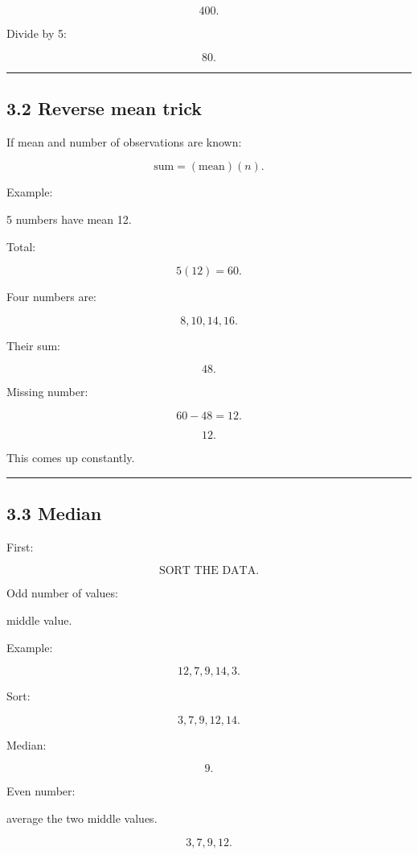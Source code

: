 \documentclass[
]{article}
\begin{document}
\[
400.
\]

Divide by 5:

\[
\boxed{80}.
\]

\begin{center}\rule{0.5\linewidth}{0.5pt}\end{center}

\subsection{3.2 Reverse mean trick}\label{reverse-mean-trick}

If mean and number of observations are known:

\[
\boxed{\text{sum}=(\text{mean})(n)}.
\]

Example:

5 numbers have mean 12.

Total:

\[
5(12)=60.
\]

Four numbers are:

\[
8,10,14,16.
\]

Their sum:

\[
48.
\]

Missing number:

\[
60-48=12.
\]

\[
\boxed{12}.
\]

This comes up constantly.

\begin{center}\rule{0.5\linewidth}{0.5pt}\end{center}

\subsection{3.3 Median}\label{median}

First:

\[
\boxed{\text{SORT THE DATA}}.
\]

Odd number of values:

middle value.

Example:

\[
12,7,9,14,3.
\]

Sort:

\[
3,7,9,12,14.
\]

Median:

\[
\boxed9.
\]

Even number:

average the two middle values.

\[
3,7,9,12.
\]
\end{document}
